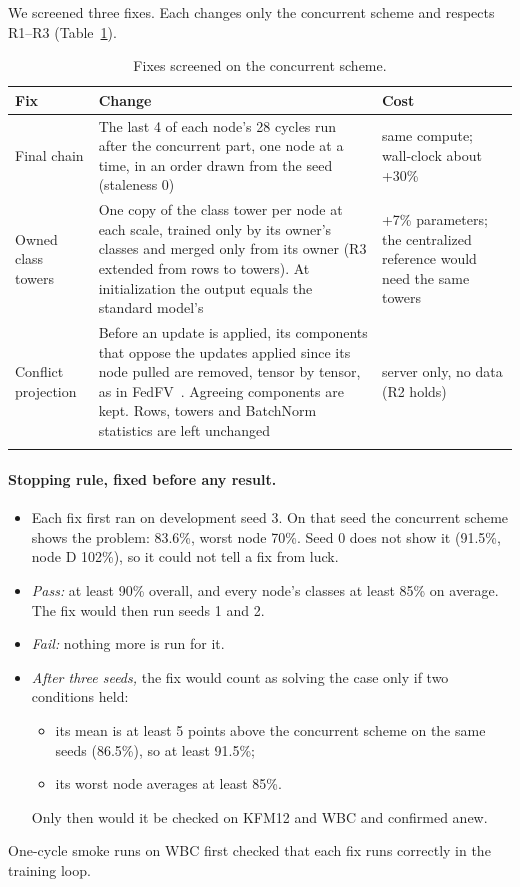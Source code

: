 \documentclass[pdflatex,sn-mathphys-num]{sn-jnl}
\begin{document}
We screened three fixes. Each changes only the concurrent scheme and respects R1--R3 (Table~\ref{tab:s-fixes}).

\begin{table}[h]
\caption{Fixes screened on the concurrent scheme.}\label{tab:s-fixes}
\footnotesize
\begin{tabular*}{\textwidth}{@{\extracolsep\fill}>{\raggedright\arraybackslash}p{}>{\raggedright\arraybackslash}p{}>{\raggedright\arraybackslash}p{}}
\toprule
Fix & Change & Cost \\
\midrule
Final chain & The last 4 of each node's 28 cycles run after the concurrent part, one node at a time, in an order drawn from the seed (staleness 0) & same compute; wall-clock about +30\% \\
Owned class towers & One copy of the class tower per node at each scale, trained only by its owner's classes and merged only from its owner (R3 extended from rows to towers). At initialization the output equals the standard model's & +7\% parameters; the centralized reference would need the same towers \\
Conflict projection & Before an update is applied, its components that oppose the updates applied since its node pulled are removed, tensor by tensor, as in FedFV~\cite{wang2021fedfv}. Agreeing components are kept. Rows, towers and BatchNorm statistics are left unchanged & server only, no data (R2 holds) \\
\botrule
\end{tabular*}
\end{table}

\paragraph{Stopping rule, fixed before any result.}
\begin{itemize}
\item Each fix first ran on development seed 3. On that seed the concurrent scheme shows the problem: 83.6\%, worst node 70\%. Seed 0 does not show it (91.5\%, node D 102\%), so it could not tell a fix from luck.
\item \emph{Pass:} at least 90\% overall, and every node's classes at least 85\% on average. The fix would then run seeds 1 and 2.
\item \emph{Fail:} nothing more is run for it.
\item \emph{After three seeds,} the fix would count as solving the case only if two conditions held:
  \begin{itemize}
  \item its mean is at least 5 points above the concurrent scheme on the same seeds (86.5\%), so at least 91.5\%;
  \item its worst node averages at least 85\%.
  \end{itemize}
  Only then would it be checked on KFM12 and WBC and confirmed anew.
\end{itemize}
One-cycle smoke runs on WBC first checked that each fix runs correctly in the training loop.
\end{document}
